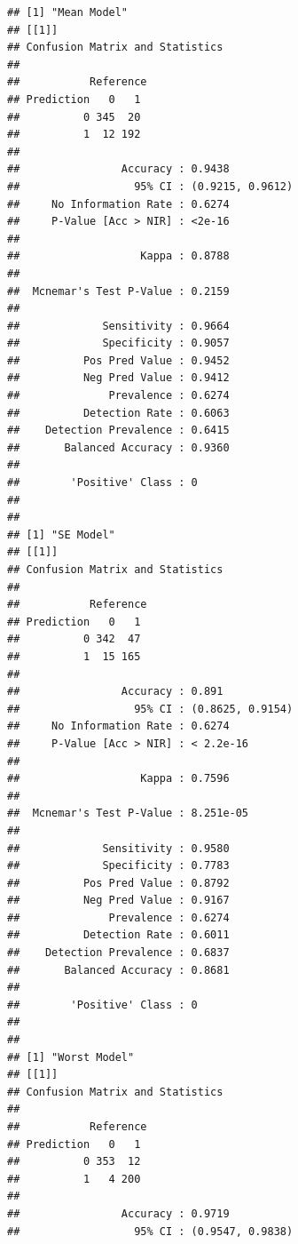 \documentclass[
]{article}
\begin{document}
\begin{verbatim}
## [1] "Mean Model"
## [[1]]
## Confusion Matrix and Statistics
## 
##           Reference
## Prediction   0   1
##          0 345  20
##          1  12 192
##                                           
##                Accuracy : 0.9438          
##                  95% CI : (0.9215, 0.9612)
##     No Information Rate : 0.6274          
##     P-Value [Acc > NIR] : <2e-16          
##                                           
##                   Kappa : 0.8788          
##                                           
##  Mcnemar's Test P-Value : 0.2159          
##                                           
##             Sensitivity : 0.9664          
##             Specificity : 0.9057          
##          Pos Pred Value : 0.9452          
##          Neg Pred Value : 0.9412          
##              Prevalence : 0.6274          
##          Detection Rate : 0.6063          
##    Detection Prevalence : 0.6415          
##       Balanced Accuracy : 0.9360          
##                                           
##        'Positive' Class : 0               
##                                           
## 
## [1] "SE Model"
## [[1]]
## Confusion Matrix and Statistics
## 
##           Reference
## Prediction   0   1
##          0 342  47
##          1  15 165
##                                           
##                Accuracy : 0.891           
##                  95% CI : (0.8625, 0.9154)
##     No Information Rate : 0.6274          
##     P-Value [Acc > NIR] : < 2.2e-16       
##                                           
##                   Kappa : 0.7596          
##                                           
##  Mcnemar's Test P-Value : 8.251e-05       
##                                           
##             Sensitivity : 0.9580          
##             Specificity : 0.7783          
##          Pos Pred Value : 0.8792          
##          Neg Pred Value : 0.9167          
##              Prevalence : 0.6274          
##          Detection Rate : 0.6011          
##    Detection Prevalence : 0.6837          
##       Balanced Accuracy : 0.8681          
##                                           
##        'Positive' Class : 0               
##                                           
## 
## [1] "Worst Model"
## [[1]]
## Confusion Matrix and Statistics
## 
##           Reference
## Prediction   0   1
##          0 353  12
##          1   4 200
##                                           
##                Accuracy : 0.9719          
##                  95% CI : (0.9547, 0.9838)

\end{verbatim}
\end{document}
